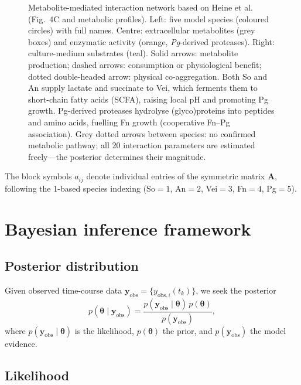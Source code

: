 \documentclass[11pt,a4paper]{article}
\newcommand{\btheta}{\boldsymbol{\theta}}
\newcommand{\yobs}{\mathbf{y}_{\mathrm{obs}}}
\begin{document}
\begin{figure}[htbp]
\caption{Metabolite-mediated interaction network based on Heine et al.~\cite{Heine2025PeriImplant} (Fig.~4C and metabolic profiles).
Left: five model species (coloured circles) with full names.
Centre: extracellular metabolites (grey boxes) and enzymatic activity (orange, \textit{Pg}-derived proteases).
Right: culture-medium substrates (teal).
Solid arrows: metabolite production; dashed arrows: consumption or physiological benefit; dotted double-headed arrow: physical co-aggregation.
Both So and An supply lactate and succinate to Vei, which ferments them to short-chain fatty acids (SCFA), raising local pH and promoting Pg growth.
Pg-derived proteases hydrolyse (glyco)proteins into peptides and amino acids, fuelling Fn growth (cooperative Fn--Pg association).
Grey dotted arrows between species: no confirmed metabolic pathway; all 20 interaction parameters are estimated freely---the posterior determines their magnitude.}
\label{fig:network}
\end{figure}

The block symbols $a_{ij}$ denote individual entries of the symmetric matrix $\mathbf{A}$, following the 1-based species indexing (So$=1$, An$=2$, Vei$=3$, Fn$=4$, Pg$=5$).

\section{Bayesian inference framework}
\label{sec:bayes}

\subsection{Posterior distribution}

Given observed time-course data $\yobs = \{y_{\mathrm{obs},i}(t_k)\}$, we seek the posterior
\begin{equation}
p(\btheta\mid\yobs)
= \frac{p(\yobs\mid\btheta)\,p(\btheta)}{p(\yobs)},
\label{eq:bayes}
\end{equation}
where $p(\yobs\mid\btheta)$ is the likelihood, $p(\btheta)$ the prior, and $p(\yobs)$ the model evidence.

\subsection{Likelihood}
\end{document}
